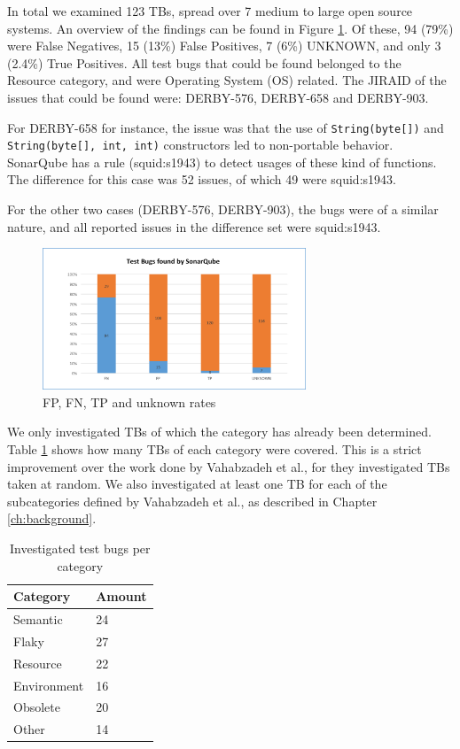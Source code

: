 \documentclass{uvamscse}
\newcommand{\Atestbugs}{Vahabzadeh et al.}
\begin{document}
In total we examined 123 TBs, spread over 7 medium to large open source systems. An overview of the findings can be found in Figure \ref{fig:SQresults}. Of these, 94 (79\%) were False Negatives, 15 (13\%) False Positives, 7 (6\%) UNKNOWN, and only 3 (2.4\%) True Positives. All test bugs that could be found belonged to the Resource category, and were Operating System (OS) related. The JIRAID of the issues that could be found were: DERBY-576, DERBY-658 and DERBY-903. 

For DERBY-658 for instance, the issue was that the use of \texttt{String(byte[])} and \texttt{String(byte[], int, int)} constructors led to non-portable behavior. SonarQube has a rule (squid:s1943) to detect usages of these kind of functions. The difference for this case was 52 issues, of which 49 were squid:s1943. 

For the other two cases (DERBY-576, DERBY-903), the bugs were of a similar nature, and all reported issues in the difference set were squid:s1943.   

\begin{figure}[!ht]
	\centering
	\includegraphics[width=0.7\textwidth]{figures/SQresults.png}
	\caption{FP, FN, TP and unknown rates}
	\label{fig:SQresults}
\end{figure}

We only investigated TBs of which the category has already been determined. Table \ref{table:sumCatTBs} shows how many TBs of each category were covered. This is a strict improvement over the work done by \Atestbugs, for they investigated TBs taken at random. We also investigated at least one TB for each of the subcategories defined by \Atestbugs, as described in Chapter  \ref{ch:background}.

\begin{table}[]
	\centering
	
	\label{table:sumCatTBs}
	\begin{tabular}{l|l}
		\textbf{Category}    & \textbf{Amount} \\
		\hline
		Semantic    & 24     \\
		Flaky       & 27     \\
		Resource    & 22     \\
		Environment & 16     \\
		Obsolete    & 20     \\
		Other       & 14    
	\end{tabular}
	\caption{Investigated test bugs per category}
\end{table}
\end{document}

